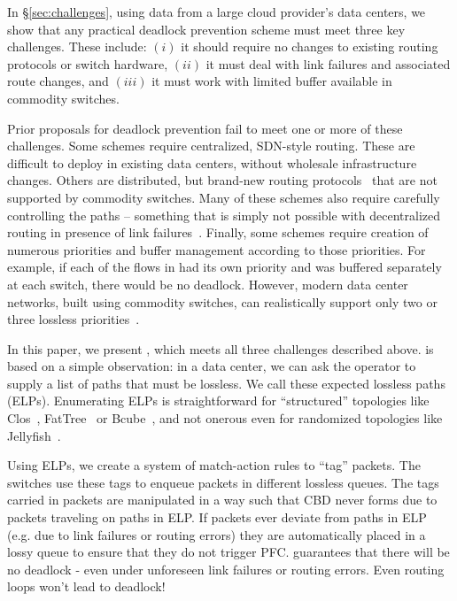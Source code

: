 In \S\ref{sec:challenges}, using data from a large cloud provider's data
centers, we show that any practical deadlock prevention scheme must meet three
key challenges. These include: $(i)$ it should require no changes to existing
routing protocols or switch hardware, $(ii)$ it must deal with link failures and
associated  route changes, and $(iii)$ it must work with limited buffer
available in commodity switches.

Prior proposals for deadlock prevention fail to meet one or more of these
challenges.  Some schemes require centralized, SDN-style routing.  These are
difficult to deploy in existing data centers, without wholesale infrastructure
changes.  Others are distributed, but brand-new routing protocols~\cite{tcpbolt}
that are not supported by commodity switches.  Many of these schemes also
require carefully controlling the paths -- something that is simply not possible
with decentralized routing in presence of link failures~\cite{netpilot}.
Finally, some schemes require creation of numerous priorities and buffer
management according to those priorities. For example, if each of the flows in
had its own priority and was buffered
separately at each switch, there would be no deadlock.  However, modern data
center networks, built using commodity switches, can realistically support only
two or three lossless priorities~\cite{rdmaatscale}.

In this paper, we present \sysname{}, which meets all three challenges described
above. \sysname{} is based on a simple observation: in a data center, we can ask
the operator to supply a list of paths that must be lossless.
We call these expected lossless paths (ELPs). Enumerating ELPs is
straightforward for ``structured'' topologies like Clos~\cite{clos},
FatTree~\cite{fattree} or Bcube~\cite{bcube}, and not onerous even for
randomized topologies like Jellyfish~\cite{jellyfish}.

Using ELPs, we create a system of match-action rules to ``tag'' packets. The
switches use these tags to enqueue packets in different lossless queues. The tags 
carried in packets are manipulated in a way 
such that CBD never forms due to packets traveling on paths in ELP.
If packets ever deviate from paths in ELP (e.g. due to link failures or routing
errors) they are automatically placed in a lossy queue to ensure that they do
not trigger PFC. \sysname{} guarantees that there will be no deadlock - even under
unforeseen link failures or routing errors. Even routing loops won't lead to
deadlock!

